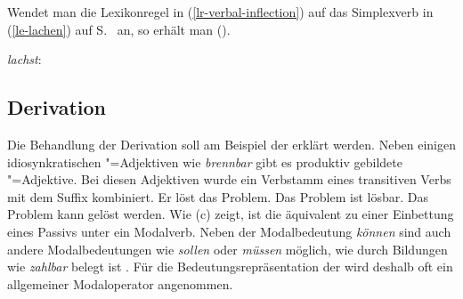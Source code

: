 Wendet man die Lexikonregel in (\ref{lr-verbal-inflection}) auf das Simplexverb
 in (\ref{le-lachen}) auf S.~\pageref{le-lachen} an, so erhält man 
().

\eas
\label{le-lachst}%
\mbox{\emph{lachst}:}\\
\zs
{}







\subsection{Derivation}
\label{sec-bard}

Die Behandlung der Derivation soll am Beispiel der \bard erklärt werden. Neben einigen idiosynkratischen
"=Adjektiven wie \zb \emph{brennbar} gibt es produktiv gebildete "=Adjektive.
Bei diesen Adjektiven wurde ein Verbstamm eines transitiven Verbs mit dem Suffix  kombiniert.
\eal
\ex Er löst das Problem.
\ex Das Problem ist lösbar.
\ex Das Problem kann gelöst werden.
\zl
Wie (c) zeigt, ist die \bard äquivalent zu einer Einbettung eines Passivs unter ein Modalverb. Neben
der Modalbedeutung \emph{können} sind auch andere Modalbedeutungen wie \zb \emph{sollen} oder \emph{müssen}
möglich, wie durch Bildungen wie \emph{zahlbar} belegt ist \citep[292]{Gelhaus77}. Für die Bedeutungsrepräsentation der \bard wird
deshalb oft ein allgemeiner Modaloperator angenommen.

